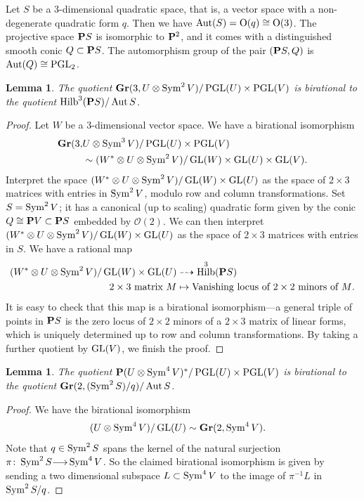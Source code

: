 \documentclass[11pt,reqno]{amsart}
\theoremstyle{plain}
\newtheorem{lemma}[theorem]{Lemma}
\theoremstyle{definition}
\theoremstyle{remark}
\numberwithin{equation}{section}
\DeclareMathOperator{\Hilb}{Hilb}
\renewcommand{\to}{{\longrightarrow}}
\numberwithin{equation}{section}
\renewcommand{\O}{\mathcal O}
\begin{document}
Let $S$ be a 3-dimensional quadratic space, that is, a vector space with a non-degenerate quadratic form $q$.
Then we have $\Aut(S) =  \operatorname{O}(q) \cong \operatorname{O(3)}$.
The projective space $\P S$ is isomorphic to $\P^2$, and it comes with a distinguished smooth conic $Q \subset \P S$.
The automorphism group of the pair $(\P S, Q)$ is $\Aut(Q) \cong \PGL_2$.
\begin{lemma}\label{lem:quotgrass}
  The quotient $\Gr(3, U \otimes \Sym^2V) / \PGL(U) \times \PGL(V)$ is birational to the quotient $\Hilb^3(\P S) / \Aut S$.
\end{lemma}
\begin{proof}
  Let $W$ be a 3-dimensional vector space.
  We have a birational isomorphism
  \begin{align*}
    \Gr(3, &U \otimes \Sym^3 V) / \PGL(U) \times \PGL(V)\\
           &\sim (W^* \otimes U \otimes \Sym^2 V) / \GL(W) \times \GL(U) \times \GL(V).
  \end{align*}
  Interpret the space $(W^* \otimes U \otimes \Sym^2 V) / \GL(W) \times \GL(U)$ as the space of $2 \times 3$ matrices with entries in $\Sym^2 V$, modulo row and column transformations.
  Set $S = \Sym^2 V$; it has a canonical (up to scaling) quadratic form given by the conic $Q \cong \P V\subset \P S$ embedded by $\O(2)$.
  We can then interpret $(W^* \otimes U \otimes \Sym^2 V) / \GL(W) \times \GL(U)$ as the space of $2 \times 3$ matrices with entries in $S$.
  We have a rational map
  \begin{align*}
    (W^* \otimes U \otimes \Sym^2 V) / \GL(W) \times \GL(U) &\dashrightarrow
                                                              \Hilb^3(\P S) \\
    \text{$2 \times 3$ matrix $M$} &\mapsto \text{Vanishing locus of $2\times 2$ minors of $M$}.
  \end{align*}
  It is easy to check that this map is a birational isomorphism---a general triple of points in $\P S$ is the zero locus of $2 \times 2$ minors of a $2 \times 3$ matrix of linear forms, which is uniquely determined up to row and column transformations.
  By taking a further quotient by $\GL(V)$, we finish the proof.  
\end{proof}

\begin{lemma}\label{lem:quotram}
  The quotient $\P(U \otimes \Sym^4 V)^* / \PGL(U) \times \PGL(V)$ is birational to the quotient $\Gr(2, (\Sym^2 S)/q) / \Aut S$.
\end{lemma}
\begin{proof}
  We have the birational isomorphism
  \begin{align*}
    (U \otimes \Sym^4 V) / \GL(U) &\sim \Gr(2, \Sym^4 V).
  \end{align*}
  Note that $q \in \Sym^2S$ spans the kernel of the natural surjection $\pi \from \Sym^2 S \to \Sym^4 V$.
  So the claimed birational isomorphism is given by sending a two dimensional subspace $L \subset \Sym^4 V$ to the image of $\pi^{-1}L$ in $\Sym^2S/q$.
\end{proof}
\end{document}
